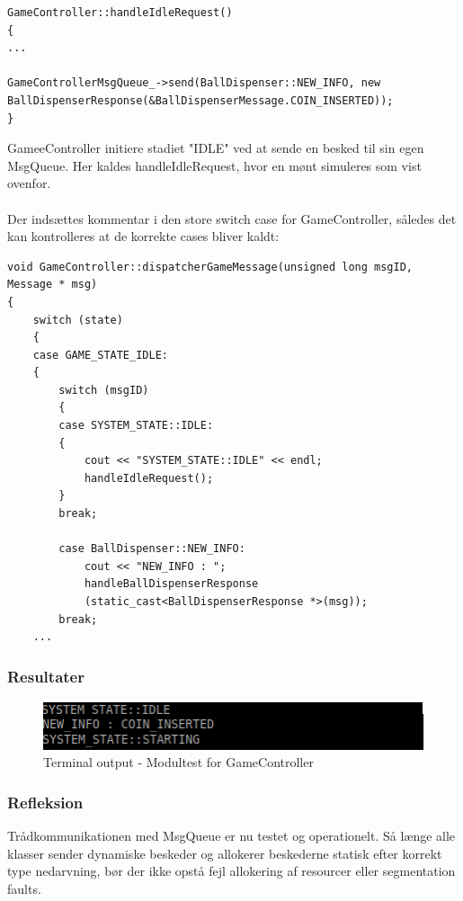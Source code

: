 \documentclass[Modultest/Modultest_main.tex]{subfiles}
\begin{document}
\begin{lstlisting}
GameController::handleIdleRequest()
{
...

GameControllerMsgQueue_->send(BallDispenser::NEW_INFO, new
BallDispenserResponse(&BallDispenserMessage.COIN_INSERTED));
}
\end{lstlisting}
GameeController initiere stadiet "IDLE" ved at sende en besked til sin egen MsgQueue. Her kaldes handleIdleRequest, hvor en mønt simuleres som vist ovenfor. \\\\
Der indsættes kommentar i den store switch case for GameController, således det kan kontrolleres at de korrekte cases bliver kaldt: 
\begin{lstlisting}
void GameController::dispatcherGameMessage(unsigned long msgID, Message * msg)
{
	switch (state)
	{
	case GAME_STATE_IDLE:
	{
		switch (msgID)
		{
		case SYSTEM_STATE::IDLE:
		{
			cout << "SYSTEM_STATE::IDLE" << endl;
			handleIdleRequest();
		}
		break;

		case BallDispenser::NEW_INFO:
			cout << "NEW_INFO : ";
			handleBallDispenserResponse
			(static_cast<BallDispenserResponse *>(msg));
		break;
    ...
\end{lstlisting}

\subsubsection{Resultater}
\begin{figure}[H]
    \centering
    \includegraphics[width=\textwidth]{Modultest/GameController/graphic/Modeltest.png}
    \caption{Terminal output - Modultest for GameController}
    \label{fig:test_game}
\end{figure}

\subsubsection{Refleksion}
Trådkommunikationen med MsgQueue er nu testet og operationelt. Så længe alle klasser sender dynamiske beskeder og allokerer beskederne statisk efter korrekt type nedarvning, bør der ikke opstå fejl allokering af resourcer eller segmentation faults.
\end{document}
